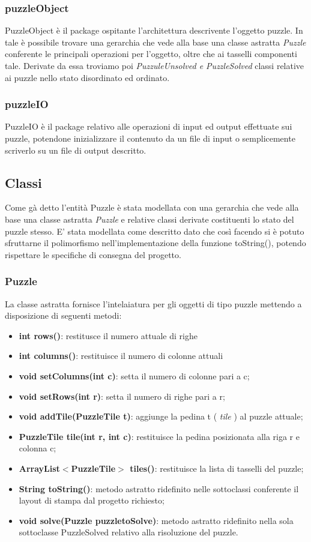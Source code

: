 \documentclass[11pt]{article}
\begin{document}
\subsubsection{puzzleObject}
PuzzleObject è il package ospitante l'architettura descrivente l'oggetto puzzle. In tale è  possibile trovare una gerarchia che vede alla base una classe astratta \textit{Puzzle} conferente le principali operazioni per l'oggetto, oltre che ai tasselli componenti tale. Derivate da essa troviamo poi \textit{PuzzuleUnsolved \emph{e} PuzzleSolved} classi relative ai puzzle nello stato disordinato ed ordinato. 
\subsubsection{puzzleIO}
PuzzleIO è il package relativo alle operazioni di input ed output effettuate sui puzzle, potendone inizializzare il contenuto da un file di input o semplicemente scriverlo su un file di output descritto.
\subsection{Classi}
Come gà detto l'entità Puzzle è stata modellata con una gerarchia che vede alla base una classe astratta \textit{Puzzle} e relative classi derivate costituenti lo stato del puzzle stesso. E' stata modellata come descritto dato che così facendo si è potuto sfruttarne il polimorfismo nell'implementazione della funzione toString(), potendo rispettare le specifiche di consegna del progetto.
\subsubsection{Puzzle}
La classe astratta fornisce l'intelaiatura per gli oggetti di tipo puzzle mettendo a disposizione di seguenti metodi:
\begin{itemize}
    \item \textbf{int rows()}: restitusce il numero attuale di righe
    \item \textbf{int columns()}: restituisce il numero di colonne attuali
    \item \textbf{void setColumns(int c)}: setta il numero di colonne pari a c;
    \item \textbf{void setRows(int r)}: setta il numero di righe pari a r;
    \item \textbf{void addTile(PuzzleTile t)}: aggiunge la pedina t  ( \textit{tile} ) al puzzle attuale;
    \item \textbf{PuzzleTile tile(int r, int c)}: restituisce la pedina posizionata alla riga r e colonna c;
    \item \textbf{ArrayList$<$PuzzleTile$>$ tiles()}: restituisce la lista di tasselli del puzzle;
    \item \textbf{String toString()}: metodo astratto ridefinito nelle sottoclassi conferente il layout di stampa dal progetto richiesto;
    \item \textbf{void solve(Puzzle puzzletoSolve)}: metodo astratto ridefinito nella sola sottoclasse PuzzleSolved relativo alla risoluzione del puzzle.
\end{itemize}
\end{document}
